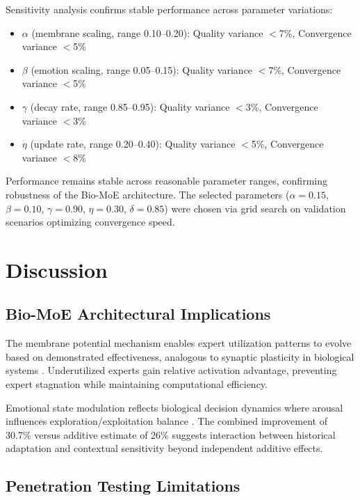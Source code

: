 \documentclass[preprint,12pt]{elsarticle}
\begin{document}
Sensitivity analysis confirms stable performance across parameter variations:

\begin{itemize}
    \item $\alpha$ (membrane scaling, range 0.10--0.20): Quality variance $<$7\%, Convergence variance $<$5\%
    \item $\beta$ (emotion scaling, range 0.05--0.15): Quality variance $<$7\%, Convergence variance $<$5\%
    \item $\gamma$ (decay rate, range 0.85--0.95): Quality variance $<$3\%, Convergence variance $<$3\%
    \item $\eta$ (update rate, range 0.20--0.40): Quality variance $<$5\%, Convergence variance $<$8\%
\end{itemize}

Performance remains stable across reasonable parameter ranges, confirming robustness of the Bio-MoE architecture. The selected parameters ($\alpha=0.15$, $\beta=0.10$, $\gamma=0.90$, $\eta=0.30$, $\delta=0.85$) were chosen via grid search on validation scenarios optimizing convergence speed.

\section{Discussion}
\label{sec:discussion}

\subsection{Bio-MoE Architectural Implications}

The membrane potential mechanism enables expert utilization patterns to evolve based on demonstrated effectiveness, analogous to synaptic plasticity in biological systems \cite{kandel2013}. Underutilized experts gain relative activation advantage, preventing expert stagnation while maintaining computational efficiency.

Emotional state modulation reflects biological decision dynamics where arousal influences exploration/exploitation balance \cite{damasio1994}. The combined improvement of 30.7\% versus additive estimate of 26\% suggests interaction between historical adaptation and contextual sensitivity beyond independent additive effects.

\subsection{Penetration Testing Limitations}
\end{document}
